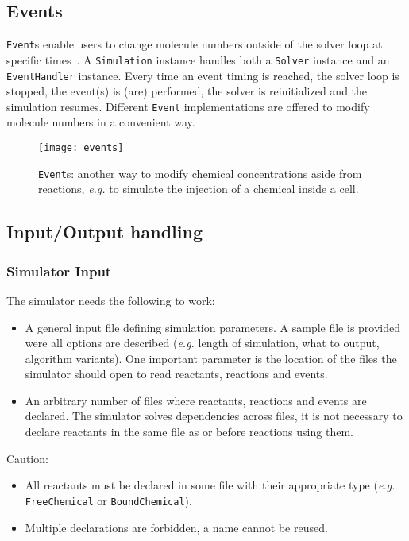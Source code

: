 \subsection{Events}

\texttt{Event}s enable users to change molecule numbers outside of the solver loop at specific times~. A \texttt{Simulation} instance handles both a \texttt{Solver} instance and an \texttt{EventHandler} instance. Every time an event timing is reached, the solver loop is stopped, the event(s) is (are) performed, the solver is reinitialized and the simulation resumes. Different \texttt{Event} implementations are offered to modify molecule numbers in a convenient way.

\begin{figure}[!h]
  \centering
  \texttt{[image: events]}
  \caption{\texttt{Event}s: another way to modify chemical concentrations aside from reactions, \textit{e.g.} to simulate the injection of a chemical inside a cell.}
  \label{fig:events}
\end{figure}

\subsection{Input/Output handling}

\subsubsection{Simulator Input}

The simulator needs the following to work:
\begin{itemize}
  \item A general input file defining simulation parameters. A sample file is provided were all options are described (\textit{e.g.} length of simulation, what to output, algorithm variants). One important parameter is the location of the files the simulator should open to read reactants, reactions and events.
  \item An arbitrary number of files where reactants, reactions and events are declared. The simulator solves dependencies across files, it is not necessary to declare reactants in the same file as or before reactions using them.
\end{itemize}

Caution:
\begin{itemize}
\item All reactants must be declared in some file with their appropriate type (\textit{e.g.} \texttt{FreeChemical} or \texttt{BoundChemical}).
\item Multiple declarations are forbidden, a name cannot be reused.
\end{itemize}

